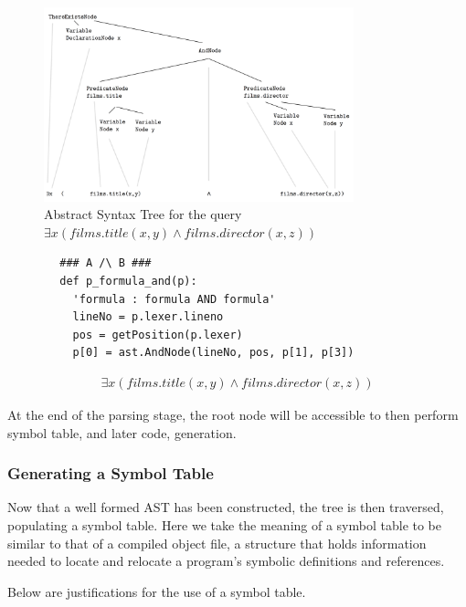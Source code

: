 \documentclass[a4paper, 11pt]{article}
\begin{document}
      \begin{figure}
      \centering
      \includegraphics[width=0.8\textwidth]{images/ASTComplex.png}
      \caption{Abstract Syntax Tree for the query $
        \exists x(films.title(x, y) \land films.director(x, z))$}
      \label{fig:complexAST}
      \end{figure}
      \begin{verbatim}
        ### A /\ B ###
        def p_formula_and(p):
          'formula : formula AND formula'
          lineNo = p.lexer.lineno
          pos = getPosition(p.lexer)
          p[0] = ast.AndNode(lineNo, pos, p[1], p[3])
      \end{verbatim}
      \begin{gather}
        \exists x(films.title(x, y) \land films.director(x, z))
      \end{gather}

      At the end of the parsing stage, the root
      node will be accessible to then perform symbol table, and later code,
      generation.

    \subsubsection{Generating a Symbol Table}

      Now that a well formed AST has been constructed, the tree is then
      traversed, populating a symbol table. Here we take the meaning of a
      symbol table to be similar to that of a compiled object file, a structure
      that holds information needed to locate and relocate a program's symbolic
      definitions and references.\cite{symtab}

      Below are justifications for the use of a symbol table.
\end{document}
